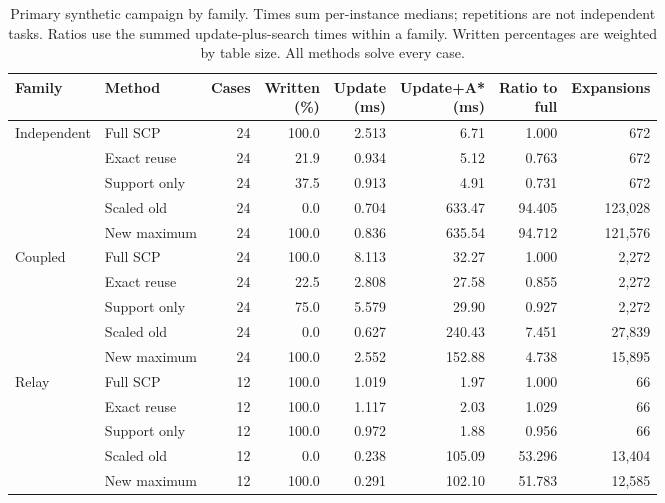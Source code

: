 \begin{landscape}
\begin{table}[p]
\centering
\begin{tabular}{llrrrrrr}
\toprule
Family & Method & Cases & \shortstack[r]{Written\\(\%)} & \shortstack[r]{Update\\(ms)} & \shortstack[r]{Update+A*\\(ms)} & \shortstack[r]{Ratio to\\full} & Expansions\\
\midrule
Independent & Full SCP & 24 & 100.0 & 2.513 & 6.71 & 1.000 & 672\\
 & Exact reuse & 24 & 21.9 & 0.934 & 5.12 & 0.763 & 672\\
 & Support only & 24 & 37.5 & 0.913 & 4.91 & 0.731 & 672\\
 & Scaled old & 24 & 0.0 & 0.704 & 633.47 & 94.405 & 123,028\\
 & New maximum & 24 & 100.0 & 0.836 & 635.54 & 94.712 & 121,576\\
\midrule
Coupled & Full SCP & 24 & 100.0 & 8.113 & 32.27 & 1.000 & 2,272\\
 & Exact reuse & 24 & 22.5 & 2.808 & 27.58 & 0.855 & 2,272\\
 & Support only & 24 & 75.0 & 5.579 & 29.90 & 0.927 & 2,272\\
 & Scaled old & 24 & 0.0 & 0.627 & 240.43 & 7.451 & 27,839\\
 & New maximum & 24 & 100.0 & 2.552 & 152.88 & 4.738 & 15,895\\
\midrule
Relay & Full SCP & 12 & 100.0 & 1.019 & 1.97 & 1.000 & 66\\
 & Exact reuse & 12 & 100.0 & 1.117 & 2.03 & 1.029 & 66\\
 & Support only & 12 & 100.0 & 0.972 & 1.88 & 0.956 & 66\\
 & Scaled old & 12 & 0.0 & 0.238 & 105.09 & 53.296 & 13,404\\
 & New maximum & 12 & 100.0 & 0.291 & 102.10 & 51.783 & 12,585\\
\bottomrule
\end{tabular}
\caption{Primary synthetic campaign by family. Times sum per-instance medians; repetitions are not independent tasks. Ratios use the summed update-plus-search times within a family. Written percentages are weighted by table size. All methods solve every case.}
\label{tab:families}
\end{table}
\end{landscape}
